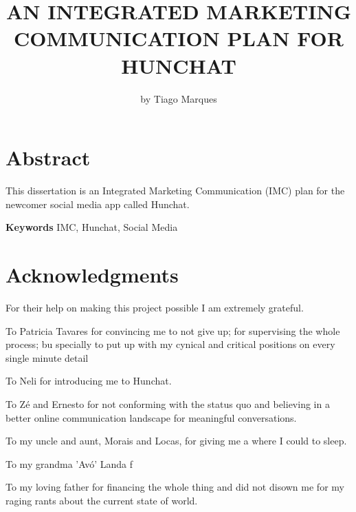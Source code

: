 \documentclass[12pt]{article}
\begin{document}
 

\begin{titlepage}
\title{AN INTEGRATED MARKETING COMMUNICATION PLAN FOR HUNCHAT}
\author{by Tiago Marques}
\maketitle
\end{titlepage}


\section*{Abstract}\label{abst}
This dissertation is an Integrated Marketing Communication (IMC) plan for the newcomer social media app called Hunchat.
  \par
 \textbf{Keywords} IMC, Hunchat, Social Media
\cleardoublepage

\section*{Acknowledgments}

For their help on making this project possible I am extremely grateful.

To Patricia Tavares for convincing me to not give up; for supervising the whole process; bu specially to put up with my cynical and critical positions on every single minute detail

To Neli for introducing me to Hunchat.

To Zé and Ernesto for not conforming with the status quo and believing in a better online communication landscape for meaningful conversations.

To my uncle and aunt, Morais and Locas, for giving me a where I could to sleep.

To my grandma 'Avó' Landa f

To my loving father for financing the whole thing and did not disown me for my raging rants about the current state of world.
\cleardoublepage

\thispagestyle{empty}



\tableofcontents
\cleardoublepage 
\listoffigures
\listoftables 
\thispagestyle{empty}
\cleardoublepage 
\setcounter{page}{1}
 
\end{document}

